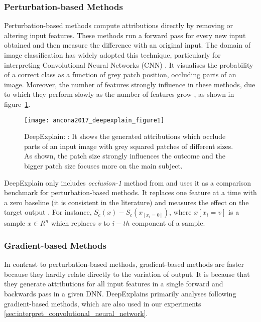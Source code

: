 \documentclass[english]{tktltiki2}
\theoremstyle{definition}
\theoremstyle{remark}
\begin{document}

\subsubsection{Perturbation-based Methods} %
Perturbation-based methods compute attributions directly by removing or altering input features. These methods run a forward pass for every new input obtained and then measure the difference with an original input. The domain of image classification has widely adopted this technique, particularly for interpreting Convolutional Neural Networks (CNN) \citep{zeiler2014visualizing}. It visualises the probability of a correct class as a function of grey patch position, occluding parts of an image. Moreover, the number of features strongly influence in these methods, due to which they perform slowly as the number of features grow \citep{zintgraf2017visualizing}, as shown in figure~\ref{fig:ancona2017_deepexplain_figure1}.

\begin{figure}[H]
	\texttt{[image: ancona2017\_deepexplain\_figure1]}
	\vspace*{-8mm}
	\caption{DeepExplain: \citep{ancona2017towards}: It shows the generated attributions which occlude parts of an input image with grey squared patches of different sizes. As shown, the patch size strongly influences the outcome and the bigger patch size focuses more on the main subject.}
	\label{fig:ancona2017_deepexplain_figure1}
\end{figure}

DeepExplain only includes \textit{occlusion-1} method from \citep{zeiler2014visualizing} and uses it as a comparison benchmark for perturbation-based methods. It replaces one feature at a time with a zero baseline (it is consistent in the literature) and measures the effect on the target output \citep{ancona2017towards}. For instance, $S_{c}(x) - S_{c}(x_{[x_i=0]})$, where $x[x_i=v]$ is a sample $x \in R^n$  which replaces $v$ to $i-th$ component of a sample.

\subsubsection{Gradient-based Methods} %
In contrast to perturbation-based methods, gradient-based methods are faster because they hardly relate directly to the variation of output. It is because that they generate attributions for all input features in a single forward and backwards pass in a given DNN. DeepExplains primarily analyses following gradient-based methods, which are also used in our experiments \ref{sec:interpret_convolutional_neural_network}.
\end{document}
